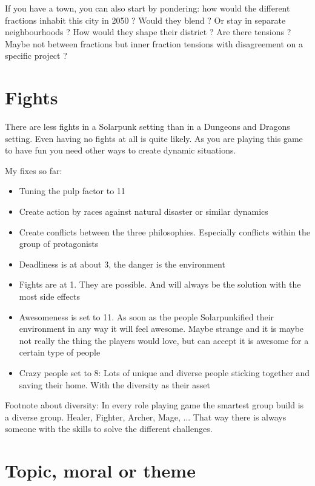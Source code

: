 If you have a town, you can also start by pondering: how would the different fractions inhabit this city in 2050 ? Would they blend ? Or stay in separate neighbourhoods ? How would they shape their district ?
Are there tensions ? Maybe not between fractions but inner fraction tensions with disagreement on a specific project ?

\section{Fights}

There are less fights in a Solarpunk setting than in a Dungeons and Dragons setting. Even having no fights at all is quite likely. As you are playing this game to have fun you need other ways to create dynamic situations.

My fixes so far:
\begin{itemize}
    \item{Tuning the pulp factor to 11}
    \item {Create action by races against natural disaster or similar dynamics}
    \item{Create conflicts between the three philosophies. Especially conflicts within the group of protagonists}
    \item {Deadliness is at about 3, the danger is the environment}
    \item {Fights are at 1. They are possible. And will always be the solution with the most side effects}
    \item {Awesomeness is set to 11. As soon as the people Solarpunkified their environment in any way it will feel awesome. Maybe strange and it is maybe not really the thing the players would love, but can accept it is awesome for a certain type of people}
    \item {Crazy people set to 8: Lots of unique and diverse people sticking together and saving their home. With the diversity as their asset}
\end{itemize}

Footnote about diversity: In every role playing game the smartest group build is a diverse group. Healer, Fighter, Archer, Mage, ... That way there is always someone with the skills to solve the different challenges.

\section{Topic, moral or theme}

